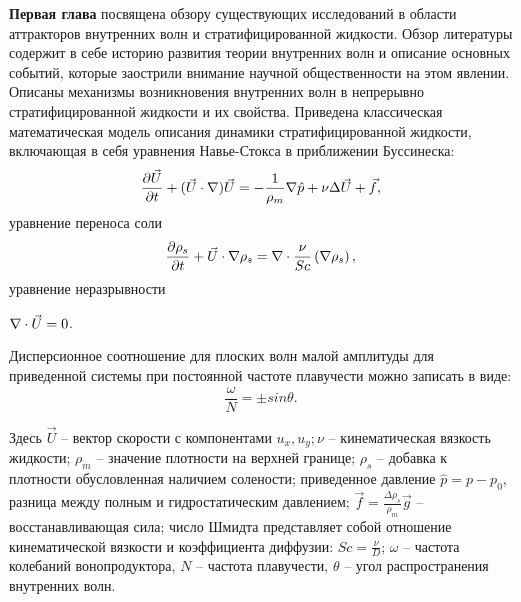 \documentclass[utf8x]{G7-32} %
\begin{document}
\textbf{Первая глава} посвящена обзору существующих исследований в области аттракторов внутренних волн и стратифицированной жидкости. Обзор литературы содержит в себе историю развития теории внутренних волн и описание основных событий, которые заострили внимание научной общественности на этом явлении. Описаны механизмы возникновения внутренних волн в непрерывно стратифицированной жидкости и их свойства. Приведена классическая математическая модель описания динамики стратифицированной жидкости, включающая в себя 
уравнения Навье-Стокса в приближении Буссинеска:
\begin{equation*}
 \large \frac{\partial \vec U}{\partial t} + (\vec U \cdot \nabla) \vec U = - \frac{1}{\rho_m} \nabla \hat p + \nu \Delta \vec U  + \vec f,
 \label{eq:momClassic}
\end{equation*}
\noindent уравнение переноса соли %
\begin{equation*}
 \large \frac{\partial \rho_s}{\partial t} + \vec U \cdot \nabla \rho_s  = \nabla \cdot \frac{\nu}{Sc} \left ( \nabla \rho_s \right ),
 \label{eq:transClassic}
\end{equation*}
\noindent уравнение неразрывности

\centerline{
  $
 \large \nabla \cdot \vec U  = 0
 \label{eq:contClassic}
 $.
}

\noindent Дисперсионное соотношение для плоских волн малой амплитуды для приведенной системы при постоянной частоте плавучести можно записать в виде:
  $$
    \frac{\omega}{N} = \pm sin \theta.
    \label{eq:dispersion}
  $$

\noindent Здесь $\vec{U}$ -- вектор скорости с компонентами $u_x,u_y; \nu$ -- кинематическая вязкость жидкости; $\rho_m$ -- значение плотности на верхней границе; $\rho_s$ -- добавка к плотности обусловленная наличием солености; приведенное давление $\hat{p}=p-p_0$, разница между полным и гидростатическим давлением; $\vec{f}=\frac{\Delta \rho_s}{\rho_m} \vec{g}$ -- восстанавливающая сила; число Шмидта представляет собой отношение кинематической вязкости и коэффициента диффузии:  $Sc = \frac{\nu}{D}$; $\omega$ -- частота колебаний вонопродуктора, $N$ -- частота плавучести, $\theta$ -- угол распространения внутренних волн. 
\end{document}
